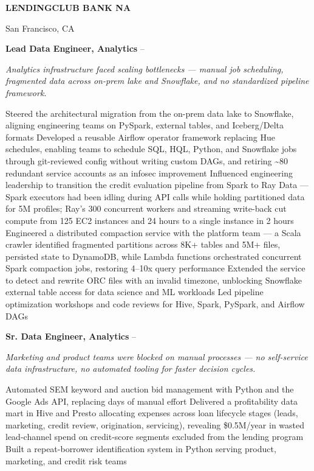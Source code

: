 \documentclass[letterpaper,MMMyyyy,nonstopmode]{simpleresumecv}
\newcommand{\CompanyName}[1]{{\fontsize{10pt}{12pt}\selectfont\bfseries\MakeUppercase{#1}}}
\begin{document}
\begin{Body}
\newpage

\par{}%
\CompanyName{LendingClub Bank NA}
\par San Francisco, CA

\Gap

\begingroup
\textbf{Lead Data Engineer, Analytics}
\hfill
{} --

\Entry
\textit{Analytics infrastructure faced scaling bottlenecks --- manual job scheduling, fragmented data across on-prem lake and Snowflake, and no standardized pipeline framework.}

\BulletItem Steered the architectural migration from the on-prem data lake to Snowflake, aligning engineering teams on PySpark, external tables, and Iceberg/Delta formats
\BulletItem Developed a reusable Airflow operator framework replacing Hue schedules, enabling teams to schedule SQL, HQL, Python, and Snowflake jobs through git-reviewed config without writing custom DAGs, and retiring \textasciitilde{}80 redundant service accounts as an infosec improvement
\BulletItem Influenced engineering leadership to transition the credit evaluation pipeline from Spark to Ray Data --- Spark executors had been idling during API calls while holding partitioned data for 5M profiles; Ray's 300 concurrent workers and streaming write-back cut compute from 125 EC2 instances and 24 hours to a single instance in 2 hours
\BulletItem Engineered a distributed compaction service with the platform team --- a Scala crawler identified fragmented partitions across 8K+ tables and 5M+ files, persisted state to DynamoDB, while Lambda functions orchestrated concurrent Spark compaction jobs, restoring 4--10x query performance
\BulletItem Extended the service to detect and rewrite ORC files with an invalid timezone, unblocking Snowflake external table access for data science and ML workloads
\BulletItem Led pipeline optimization workshops and code reviews for Hive, Spark, PySpark, and Airflow DAGs
\endgroup

\BigGap

\begingroup
\textbf{Sr. Data Engineer, Analytics}
\hfill
{} --

\Entry
\textit{Marketing and product teams were blocked on manual processes --- no self-service data infrastructure, no automated tooling for faster decision cycles.}

\BulletItem Automated SEM keyword and auction bid management with Python and the Google Ads API, replacing days of manual effort
\BulletItem Delivered a profitability data mart in Hive and Presto allocating expenses across loan lifecycle stages (leads, marketing, credit review, origination, servicing), revealing \$0.5M/year in wasted lead-channel spend on credit-score segments excluded from the lending program
\BulletItem Built a repeat-borrower identification system in Python serving product, marketing, and credit risk teams


\end{Body}
\end{document}
